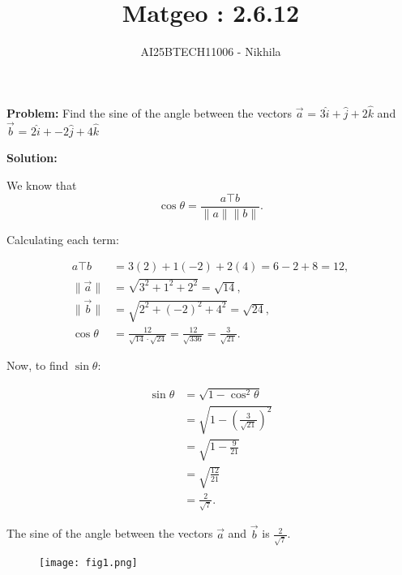 \documentclass[journal]{IEEEtran}
\begin{document}
\title{Matgeo : 2.6.12}
\author{AI25BTECH11006 - Nikhila}
\maketitle

\textbf{Problem:} Find the sine of the angle between the vectors $\vec{a}$ = $3\hat{i} + \hat{j} + 2\hat{k}$ and \\ \hspace*{1.3em} $\vec{b}$ = $2\hat{i} + -2\hat{j} + 4\hat{k}$
\vspace{1em}

\textbf{Solution:}

We know that
\[
\cos\theta = \frac{{a}\top {b}}{\|{a}\| \|{b}\|}.
\]

Calculating each term:

\begin{align}
{{a}}\top{{b}} &= 3(2) + 1(-2) + 2(4) = 6 - 2 + 8 = 12, \\
\|\vec{a}\| &= \sqrt{3^2 + 1^2 + 2^2} = \sqrt{14}, \\
\|\vec{b}\| &= \sqrt{2^2 + (-2)^2 + 4^2} = \sqrt{24}, \\
\cos\theta &= \frac{12}{\sqrt{14} \cdot \sqrt{24}} = \frac{12}{\sqrt{336}} = \frac{3}{\sqrt{21}}.
\end{align}

Now, to find \(\sin\theta\):

\begin{align}
\sin\theta &= \sqrt{1 - \cos^2\theta} \\
&= \sqrt{1 - \left(\frac{3}{\sqrt{21}}\right)^2} \\
&= \sqrt{1 - \frac{9}{21}} \\
&= \sqrt{\frac{12}{21}} \\
&= \frac{2}{\sqrt{7}}.
\end{align}

The sine of the angle between the vectors \(\vec{a}\) and \(\vec{b}\) is \(\frac{2}{\sqrt{7}}\).

\begin{figure}[ht!]
   \centering
   \texttt{[image: fig1.png]}
   \caption{}
   \label{}
\end{figure}
\end{document}
